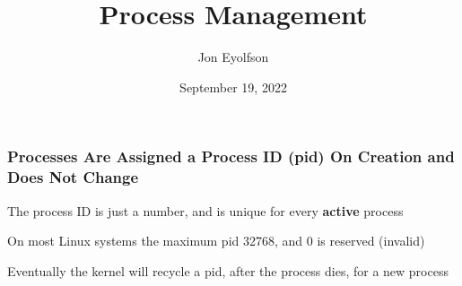 

\title{Process Management}
\author{Jon Eyolfson}
\date{September 19, 2022}


  \begin{frame}
    \titlepage
  \end{frame}

  \begin{frame}
    \frametitle{Processes Are Assigned a Process ID (pid) On Creation and Does Not Change}

    The process ID is just a number, and is unique for every \textbf{active}
    process

    \vspace{2em}

    On most Linux systems the maximum pid 32768, and 0 is reserved (invalid)

    \vspace{2em}

    Eventually the kernel will recycle a pid, after the process dies, for a new process
  \end{frame}

